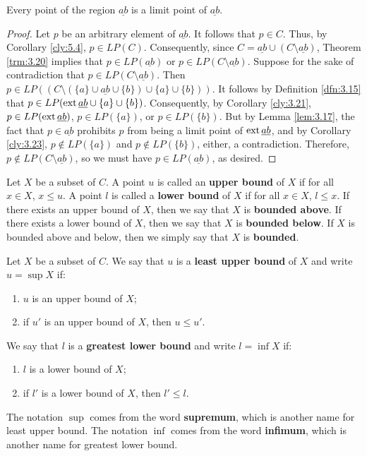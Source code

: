 \documentclass[../main.tex]{subfiles}
\begin{document}
\begin{corollary}\label{cly:5.5}
    Every point of the region $\underline{ab}$ is a limit point of $\underline{ab}$.
    \begin{proof}
        Let $p$ be an arbitrary element of $\underline{ab}$. It follows that $p\in C$. Thus, by Corollary \ref{cly:5.4}, $p\in LP(C)$. Consequently, since $C=\underline{ab}\cup(C\setminus\underline{ab})$, Theorem \ref{trm:3.20} implies that $p\in LP(\underline{ab})$ or $p\in LP(C\setminus\underline{ab})$. Suppose for the sake of contradiction that $p\in LP(C\setminus\underline{ab})$. Then $p\in LP((C\setminus(\{a\}\cup\underline{ab}\cup\{b\})\cup\{a\}\cup\{b\}))$. It follows by Definition \ref{dfn:3.15} that $p\in LP(\operatorname{ext}\underline{ab}\cup\{a\}\cup\{b\})$. Consequently, by Corollary \ref{cly:3.21}, $p\in LP(\operatorname{ext}\underline{ab})$, $p\in LP(\{a\})$, or $p\in LP(\{b\})$. But by Lemma \ref{lem:3.17}, the fact that $p\in\underline{ab}$ prohibits $p$ from being a limit point of $\operatorname{ext}\underline{ab}$, and by Corollary \ref{cly:3.23}, $p\notin LP(\{a\})$ and $p\notin LP(\{b\})$, either, a contradiction. Therefore, $p\notin LP(C\setminus\underline{ab})$, so we must have $p\in LP(\underline{ab})$, as desired.
    \end{proof}
\end{corollary}

\begin{definition}\label{dfn:5.6}
    Let $X$ be a subset of $C$. A point $u$ is called an \textbf{upper bound} of $X$ if for all $x\in X$, $x\leq u$. A point $l$ is called a \textbf{lower bound} of $X$ if for all $x\in X$, $l\leq x$. If there exists an upper bound of $X$, then we say that $X$ is \textbf{bounded above}. If there exists a lower bound of $X$, then we say that $X$ is \textbf{bounded below}. If $X$ is bounded above and below, then we simply say that $X$ is \textbf{bounded}.
\end{definition}

\begin{definition}\label{dfn:5.7}
    Let $X$ be a subset of $C$. We say that $u$ is a \textbf{least upper bound} of $X$ and write $u=\sup X$ if:
    \begin{enumerate}
        \item $u$ is an upper bound of $X$;
        \item if $u'$ is an upper bound of $X$, then $u\leq u'$.
    \end{enumerate}
    We say that $l$ is a \textbf{greatest lower bound} and write $l=\inf X$ if:
    \begin{enumerate}
        \item $l$ is a lower bound of $X$;
        \item if $l'$ is a lower bound of $X$, then $l'\leq l$.
    \end{enumerate}
    The notation $\sup$ comes from the word \textbf{supremum}, which is another name for least upper bound. The notation $\inf$ comes from the word \textbf{infimum}, which is another name for greatest lower bound.
\end{definition}
\end{document}
